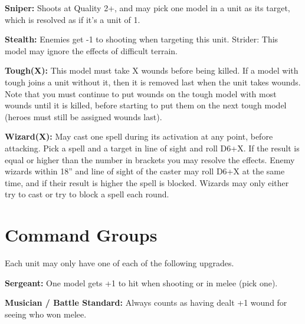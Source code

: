 \documentclass[6pt]{scrreport}
\begin{document}
\textbf{Sniper:} Shoots at Quality 2+, and may
pick one model in a unit as its target,
which is resolved as if it’s a unit of 1.

\textbf{Stealth:} Enemies get -1 to shooting when
targeting this unit.
Strider: This model may ignore the
effects of difficult terrain.

\textbf{Tough(X):} This model must take X
wounds before being killed. If a model
with tough joins a unit without it, then it
is removed last when the unit takes
wounds. Note that you must continue to
put wounds on the tough model with
most wounds until it is killed, before
starting to put them on the next tough
model (heroes must still be assigned
wounds last).

\textbf{Wizard(X):} May cast one spell during its
activation at any point, before attacking.
Pick a spell and a target in line of sight
and roll D6+X. If the result is equal or
higher than the number in brackets you
may resolve the effects. Enemy wizards
within 18” and line of sight of the caster
may roll D6+X at the same time, and if
their result is higher the spell is blocked.
Wizards may only either try to cast or
try to block a spell each round.

\section*{Command Groups}

Each unit may only have one of each of
the following upgrades.

\textbf{Sergeant:} One model gets +1 to hit when
shooting or in melee (pick one).

\textbf{Musician / Battle Standard:} Always
counts as having dealt +1 wound for
seeing who won melee.
\end{document}
